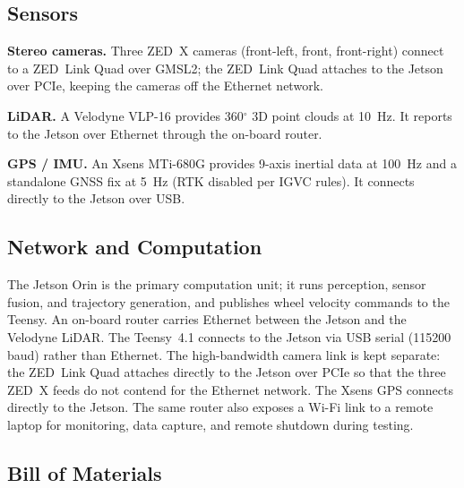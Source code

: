 \documentclass[12pt, letterpaper]{article}
\begin{document}
\subsection{Sensors}

\textbf{Stereo cameras.} Three ZED~X cameras (front-left, front, front-right) connect
to a ZED~Link Quad over GMSL2; the ZED~Link Quad attaches to the Jetson over PCIe,
keeping the cameras off the Ethernet network.

\textbf{LiDAR.} A Velodyne VLP-16 provides 360$^\circ$ 3D point clouds at 10~Hz. It
reports to the Jetson over Ethernet through the on-board router.

\textbf{GPS / IMU.} An Xsens MTi-680G provides 9-axis inertial data at 100~Hz and a
standalone GNSS fix at 5~Hz (RTK disabled per IGVC rules). It connects directly to the
Jetson over USB.

\subsection{Network and Computation}

The Jetson Orin is the primary computation unit; it runs perception, sensor fusion, and
trajectory generation, and publishes wheel velocity commands to the Teensy. An on-board
router carries Ethernet between the Jetson and the Velodyne LiDAR. The Teensy~4.1
connects to the Jetson via USB serial (115200 baud) rather than Ethernet. The
high-bandwidth camera link is kept separate: the ZED~Link Quad attaches directly to the
Jetson over PCIe so that the three ZED~X feeds do not contend for the Ethernet network.
The Xsens GPS connects directly to the Jetson. The same router also exposes a Wi-Fi
link to a remote laptop for monitoring, data capture, and remote shutdown during
testing.

\subsection{Bill of Materials}
\end{document}
